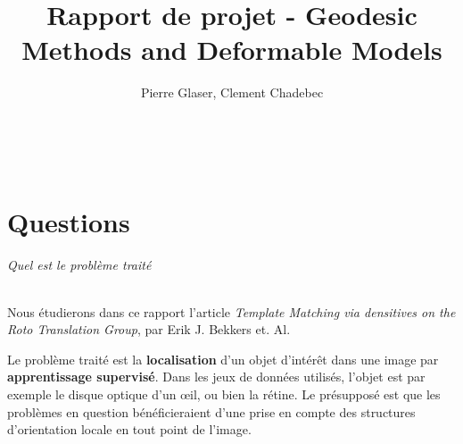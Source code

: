 \documentclass{article}
\author{Pierre Glaser, Clement Chadebec}
\title{Rapport de projet - Geodesic Methods and Deformable Models}
\begin{document}
\maketitle
$ \quad $
\part{Questions}


\paragraph{Quel est le problème traité} 
Nous étudierons dans ce rapport l'article \emph{Template Matching via densitives on the
Roto Translation Group}, par Erik J. Bekkers et. Al.

Le problème traité est la \textbf{localisation} d'un objet d'intérêt dans une image par
\textbf{apprentissage supervisé}. Dans les jeux de
données utilisés, l'objet est par exemple le disque optique d'un œil, ou bien la
rétine. Le présupposé est que les problèmes en question bénéficieraient d'une prise en
compte des structures d'orientation locale en tout point de l'image.
\end{document}
